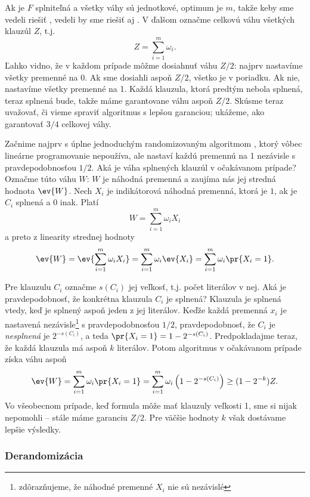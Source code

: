\noindent
Ak je $F$ splniteľná a všetky váhy sú jednotkové, optimum je $m$, takže keby sme vedeli riešiť \maxsat,
vedeli by sme riešiť aj \sat. V ďalšom označme celkovú váhu všetkých klauzúl $Z$, t.j.
$$Z=\sum_{i=1}^m\omega_i.$$
Ľahko vidno, že v každom prípade môžme dosiahnuť váhu $Z/2$: najprv nastavíme všetky premenné 
na $0$. Ak sme dosiahli aspoň $Z/2$, všetko je v poriadku. Ak nie, nastavíme všetky premenné na 1.
Každá klauzula, ktorá predtým nebola splnená, teraz splnená bude, takže máme garantovane váhu aspoň $Z/2$.
Skúsme teraz uvažovať, či vieme spraviť algoritmus s lepšou garanciou; ukážeme, ako garantovať 
$3/4$ celkovej váhy.


\noindent
Začnime najprv s úplne jednoduchým randomizovaným algoritmom , ktorý vôbec lineárne programovanie nepoužíva,
ale nastaví každú premennú na 1 nezávisle s pravdepodobnosťou $1/2$.
Aká je váha splnených klauzúl v očakávanom prípade? Označme túto váhu $W$: $W$ je náhodná premenná
a zaujíma nás jej stredná hodnota 
$\ev{W}$.
Nech $X_i$ je indikátorová
náhodná premenná, ktorá je $1$, ak je $C_i$ splnená a $0$ inak. Platí
$$W=\sum_{i=1}^m\omega_iX_i$$
a preto z linearity strednej hodnoty
$$\ev{W}=\ev{\sum_{i=1}^m\omega_iX_i}=\sum_{i=1}^m\omega_i\ev{X_i}
=\sum_{i=1}^m\omega_i\pr{X_i=1}.$$

\noindent
Pre klauzulu $C_i$ označme $s(C_i)$ jej veľkosť, t.j. počet literálov v nej.
Aká je pravdepodobnosť, že konkrétna klauzula $C_i$ je splnená? Klauzula je splnená vtedy,
keď je splnený aspoň jeden z jej literálov. Keďže každá premenná $x_i$ je nastavená nezávisle\footnote{%
zdôrazňujeme, že náhodné premenné $X_i$ nie sú nezávislé} s pravdepodobnosťou $1/2$,
pravdepodobnosť, že $C_i$ je {\em nesplnená} je $2^{-s(C_i)}$, a teda
$\pr{X_i=1}=1-2^{-s(C_i)}$. Predpokladajme teraz, že každá klauzula má aspoň $k$ literálov.
Potom algoritmus  v očakávanom prípade získa váhu aspoň
\begin{equation}
\label{eq:maxsat:A1}
\ev{W}=\sum_{i=1}^m\omega_i\pr{X_i=1}=\sum_{i=1}^m\omega_i\left(1-2^{-s(C_i)}\right)\ge(1-2^{-k})Z.
\end{equation}
Vo všeobecnom prípade, keď formula môže mať klauzuly veľkosti 1, sme si nijak nepomohli -- stále máme
garanciu $Z/2$. Pre väčšie hodnoty $k$ však dostávame lepšie výsledky. 

\subsubsection*{Derandomizácia}

